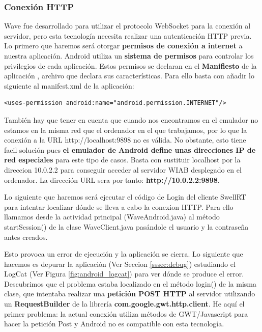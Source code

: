   
    		\subsubsection{Conexión HTTP}\label{sssec:conHttp}
	
	Wave fue desarrollado para utilizar el protocolo WebSocket para la conexión al servidor, pero esta tecnología necesita realizar una autenticación HTTP previa. Lo primero que haremos será otorgar \textbf{permisos de conexión a internet} a nuestra aplicación. Android utiliza un \textbf{sistema de permisos} \cite{ref:android_permissions} para controlar los privilegios de cada aplicación. Estos permisos se declaran en el \textbf{Manifiesto} de la aplicación \cite{ref:android_manifest}, archivo que declara sus características. Para ello basta con añadir lo siguiente al manifest.xml de la aplicación:
	  
	  \lstset{language=XML, breaklines=true, autogobble=true, basicstyle=\ttfamily\footnotesize}
	  \begin{lstlisting}[frame=single]
	  	<uses-permission android:name="android.permission.INTERNET"/>
	  \end{lstlisting}
	  
	  	 También hay que tener en cuenta que cuando nos encontramos en el emulador no estamos en la misma red que el ordenador en el que trabajamos, por lo que la conexión a la URL http://localhost:9898 no es válida. No obstante, esto tiene facil solución pues \textbf{el emulador de Android define unas direcciones IP de red especiales} \cite{ref:android_netAddress} para este tipo de casos. Basta con sustituir localhost por la direccion 10.0.2.2 para conseguir acceder al servidor WIAB desplegado en el ordenador. La dirección URL sera por tanto: \textbf{http://10.0.2.2:9898}. 
	  
	 Lo siguiente que haremos será ejecutar el código de Login del cliente SwellRT para intentar localizar dónde se lleva a cabo la conexion HTTP. Para ello llamamos desde la actividad principal (WaveAndroid.java) al método startSession() de la clase WaveClient.java pasándole el usuario y la contraseña antes creados.
 
	 Esto provoca un error de ejecución y la aplicación se cierra. Lo siguiente que hacemos es depurar la aplicación (Ver Seccion \ref{sssec:debug}) estudiando el LogCat \cite{ref:android_logcat} (Ver Figura \ref{fig:android_logcat}) para ver dónde se produce el error. Descubrimos que el problema estaba localizado en el método login() de la misma clase, que intentaba realizar una \textbf{petición POST HTTP} al servidor utilizando un \textbf{RequestBuilder} de la librería \textbf{com.google.gwt.http.client}. He aquí el primer problema: la actual conexión utiliza métodos de GWT/Javascript para hacer la petición Post y Android no es compatible con esta tecnología.   
	 

